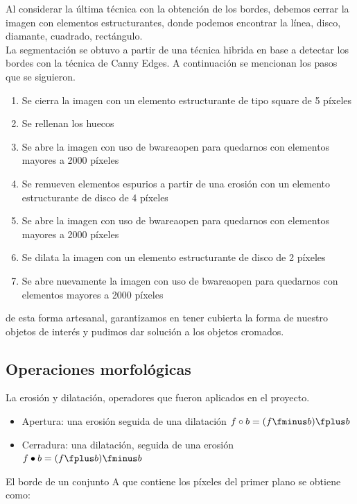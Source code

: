 \documentclass[a4paper, 11pt]{article}
\begin{document}
Al considerar la última técnica con la obtención de los bordes, debemos cerrar la imagen con elementos estructurantes, donde podemos encontrar la línea, disco, diamante, cuadrado, rectángulo.\\

La segmentación se obtuvo a partir de una técnica hibrida en base a detectar los bordes con la técnica de Canny Edges. A continuación se mencionan los pasos que se siguieron.

  \begin{enumerate}
  \item Se cierra la imagen con un elemento estructurante de tipo square de 5 píxeles
  \item Se rellenan los huecos
  \item Se abre la imagen con uso de bwareaopen para quedarnos con elementos mayores a 2000 píxeles
  \item Se remueven elementos espurios a partir de una erosión con un elemento estructurante de disco de 4 píxeles
  \item Se abre la imagen con uso de bwareaopen para quedarnos con elementos mayores a 2000 píxeles
  \item Se dilata la imagen con un elemento estructurante de disco de 2 píxeles
  \item Se abre nuevamente la imagen con uso de bwareaopen para quedarnos con elementos mayores a 2000 píxeles
  \end{enumerate}
  
  de esta forma artesanal, garantizamos en tener cubierta la forma de nuestro objetos de interés y pudimos dar solución a los objetos cromados.

\subsection{Operaciones morfológicas}

La erosión y dilatación, operadores que fueron aplicados en el proyecto.

\begin{itemize}
\item Apertura: una erosión seguida de una dilatación $f \circ b = (f \fminus b) \fplus b$
\item Cerradura: una dilatación, seguida de una erosión $f \bullet b = (f \fplus b) \fminus b$
\end{itemize}

El borde de un conjunto A que contiene los píxeles del primer plano se obtiene como:
\end{document}
